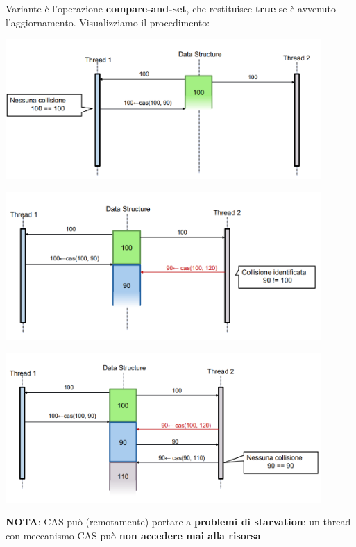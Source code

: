 \documentclass[12pt]{article}
\begin{document}
Variante è l'operazione \textbf{compare-and-set}, che restituisce \textbf{true} se è avvenuto l'aggiornamento. Visualizziamo il procedimento:
\begin{center}
    \includegraphics[width = 0.90\textwidth]{Images/89.PNG}
\end{center}
\begin{center}
    \includegraphics[width = 0.90\textwidth]{Images/90.PNG}
\end{center}
\begin{center}
    \includegraphics[width = 0.90\textwidth]{Images/91.PNG}
\end{center}
\textbf{NOTA}: CAS può (remotamente) portare a \textbf{problemi di starvation}: un thread con meccanismo CAS può \textbf{non accedere mai alla risorsa}
\end{document}
